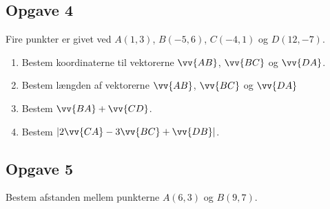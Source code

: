 \subsection*{Opgave 4}
Fire punkter er givet ved $A(1,3)$, $B(-5,6)$, $C(-4,1)$ og $D(12,-7)$.
\begin{enumerate}[label = \roman*)]
	\item Bestem koordinaterne til vektorerne $\vv{AB}$, $\vv{BC}$ og $\vv{DA}$.
	\item Bestem længden af vektorerne $\vv{AB}$, $\vv{BC}$ og $\vv{DA}$
	\item Bestem $\vv{BA} + \vv{CD}$.
	\item Bestem $|2\vv{CA} - 3\vv{BC} + \vv{DB}|$.
\end{enumerate}

\subsection*{Opgave 5}
Bestem afstanden mellem punkterne $A(6,3)$ og $B(9,7)$.
